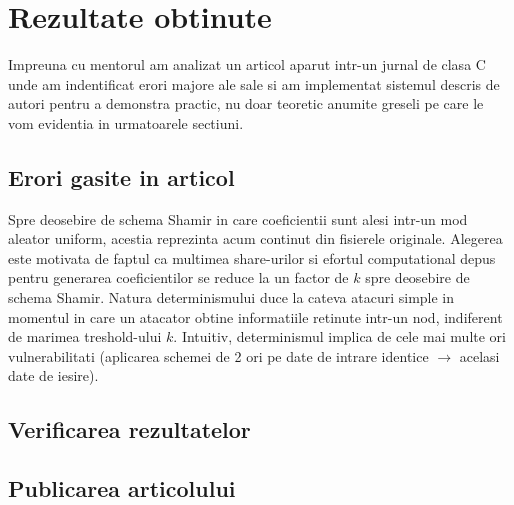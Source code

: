 \documentclass{llncs}
\begin{document}
\section{Rezultate obtinute}
Impreuna cu mentorul am analizat un articol aparut intr-un jurnal de clasa C unde am indentificat erori majore ale sale si am implementat sistemul descris de autori pentru a demonstra practic, nu doar teoretic anumite greseli pe care le vom evidentia in urmatoarele sectiuni. \cite{AAMK:2013}

\label{sec:results}
\subsection{Erori gasite in articol}


Spre deosebire de schema Shamir in care coeficientii sunt alesi intr-un mod aleator uniform, acestia
reprezinta acum continut din fisierele originale.
Alegerea este motivata de faptul ca multimea share-urilor si efortul computational depus pentru generarea coeficientilor se reduce la un factor de $k$ spre deosebire de schema Shamir. 
Natura determinismului duce la cateva atacuri simple in momentul in care un atacator obtine informatiile retinute intr-un nod, indiferent de marimea treshold-ului $k$.
Intuitiv, determinismul implica de cele mai multe ori vulnerabilitati (aplicarea schemei de 2 ori pe date de intrare identice $\rightarrow$ acelasi date de iesire).



\subsection{Verificarea rezultatelor}
\subsection{Publicarea articolului}

%
%
%



\end{document}
